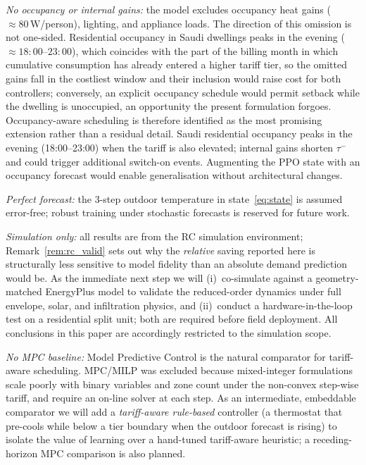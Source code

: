 \documentclass[3p,number]{elsarticle}
\newcommand{\taum}{\tau^{-}}
\begin{document}
\emph{No occupancy or internal gains:} the model excludes occupancy heat gains (${\approx}80\,\text{W}$/person), lighting, and appliance loads. The direction of this omission is not one-sided. Residential occupancy in Saudi dwellings peaks in the evening (${\approx}18{:}00$--$23{:}00$), which coincides with the part of the billing month in which cumulative consumption has already entered a higher tariff tier, so the omitted gains fall in the costliest window and their inclusion would raise cost for both controllers; conversely, an explicit occupancy schedule would permit setback while the dwelling is unoccupied, an opportunity the present formulation forgoes. Occupancy-aware scheduling is therefore identified as the most promising extension rather than a residual detail.
Saudi residential occupancy peaks in the evening (18:00--23:00) when the tariff is also elevated; internal gains shorten $\taum$ and could trigger additional switch-on events.
Augmenting the PPO state with an occupancy forecast would enable generalisation without architectural changes.
 
\emph{Perfect forecast:} the 3-step outdoor temperature in state~\eqref{eq:state} is assumed error-free; robust training under stochastic forecasts is reserved for future work.
 
\emph{Simulation only:} all results are from the RC simulation environment; Remark~\ref{rem:rc_valid} sets out why the \emph{relative} saving reported here is structurally less sensitive to model fidelity than an absolute demand prediction would be. As the immediate next step we will (i)~co-simulate against a geometry-matched EnergyPlus model to validate the reduced-order dynamics under full envelope, solar, and infiltration physics, and (ii)~conduct a hardware-in-the-loop test on a residential split unit; both are required before field deployment. All conclusions in this paper are accordingly restricted to the simulation scope.
 
\emph{No MPC baseline:} Model Predictive Control is the natural comparator for tariff-aware scheduling.
MPC/MILP was excluded because mixed-integer formulations scale poorly with binary variables and zone count under the non-convex step-wise tariff, and require an on-line solver at each step. As an intermediate, embeddable comparator we will add a \emph{tariff-aware rule-based} controller (a thermostat that pre-cools while below a tier boundary when the outdoor forecast is rising) to isolate the value of learning over a hand-tuned tariff-aware heuristic; a receding-horizon MPC comparison is also planned.
 
\end{document}
